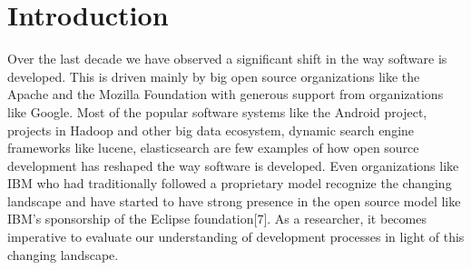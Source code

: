 
\section{Introduction}
\label{sec:intro}

Over the last decade we have observed a significant shift in the way software is developed. This is driven mainly by big open source organizations like the Apache and the Mozilla Foundation with generous support from organizations like Google. Most of the popular software systems like the Android project, projects in Hadoop and other big data ecosystem, dynamic search engine frameworks like lucene, elasticsearch are few examples of how open source development has reshaped the way software is developed. Even organizations like IBM who had traditionally followed a proprietary model recognize the changing landscape and have started to have strong presence in the open source model like IBM's sponsorship of the Eclipse foundation[7]. As a researcher, it becomes imperative to evaluate our understanding of development processes in light of this changing landscape.


